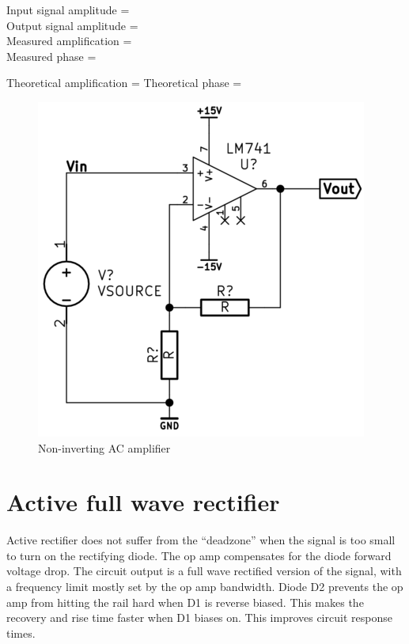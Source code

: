 \documentclass[]{article}
\begin{document}
Input signal amplitude =\\Output signal amplitude =\\Measured
amplification =\\Measured phase =

Theoretical amplification = Theoretical phase =

\begin{figure}[htbp]
\centering
\includegraphics[scale=0.5]{img/noninvACamp.png}
\caption{Non-inverting AC amplifier}
\end{figure}


\section{Active full wave rectifier}\label{active-full-wave-rectifier}

Active rectifier does not suffer from the ``deadzone'' when the signal
is too small to turn on the rectifying diode. The op amp compensates for
the diode forward voltage drop. The circuit output is a full wave
rectified version of the signal, with a frequency limit mostly set by
the op amp bandwidth. Diode D2 prevents the op amp from hitting the rail
hard when D1 is reverse biased. This makes the recovery and rise time
faster when D1 biases on. This improves circuit response times.
\end{document}
